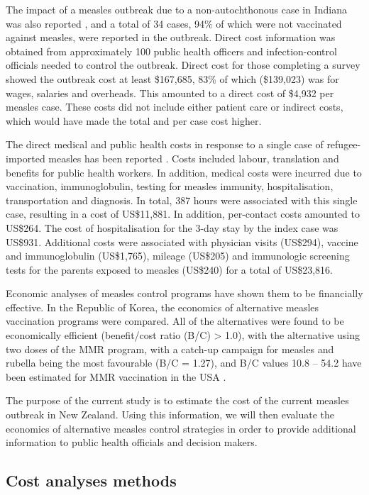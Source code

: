 \documentclass{article}
\begin{document}
The impact of a measles outbreak due to a non-autochthonous case in Indiana was also reported \citep{parker6}, and a total of 34 cases, 94\% of which were not vaccinated against measles, were reported in the outbreak. Direct cost information was obtained from approximately 100 public health officers and infection-control officials needed to control the outbreak. Direct cost for those completing a survey showed the outbreak cost at least \$167,685, 83\% of which (\$139,023) was for wages, salaries and overheads. This amounted to a direct cost of \$4,932 per measles case. These costs did not include either patient care or indirect costs, which would have made the total and per case cost higher.

The direct medical and public health costs in response to a single case of refugee-imported measles has been reported \citep{coleman12}.  Costs included labour, translation and benefits for public health workers. In addition, medical costs were incurred due to vaccination, immunoglobulin, testing for measles immunity, hospitalisation, transportation and diagnosis. In total, 387 hours were associated with this single case, resulting in a cost of US\$11,881. In addition, per-contact costs amounted to US\$264. The cost of hospitalisation for the 3-day stay by the index case was US\$931. Additional costs were associated with physician visits (US\$294), vaccine and immunoglobulin (US\$1,765), mileage (US\$205) and immunologic screening tests for the parents exposed to measles (US\$240) for a total of US\$23,816.

Economic analyses of measles control programs have shown them to be financially effective. In the Republic of Korea, the economics of alternative measles vaccination programs were compared. All of the alternatives were found to be economically efficient (benefit/cost ratio (B/C) > 1.0), with the alternative using two doses of the MMR program, with a catch-up campaign for measles and rubella being the most favourable (B/C = 1.27), and B/C values 10.8 -- 54.2 have been estimated for MMR vaccination in the USA \citep{zhou4}.

The purpose of the current study is to estimate the cost of the current measles outbreak in New Zealand. Using this information, we will then evaluate the economics of alternative measles control strategies in order to provide additional information to public health officials and decision makers.

\subsection{Cost analyses methods}
\label{sub:cost}
\end{document}
